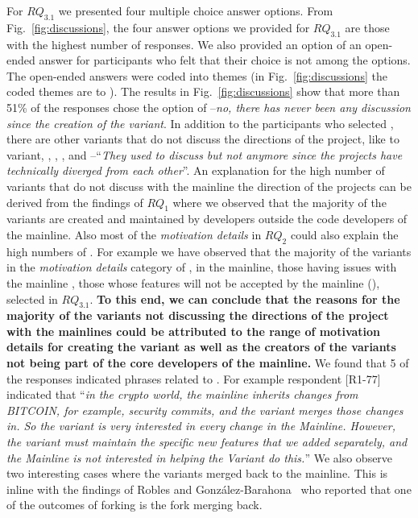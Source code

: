 \nd For $RQ_{3.1}$ we presented four multiple choice answer options. From Fig.~\ref{fig:discussions}, the four answer options we provided for $RQ_{3.1}$ are those with the highest number of responses. We also provided an option of an open-ended answer for participants who felt that their choice is not among the options. The open-ended answers were coded into themes (in Fig.~\ref{fig:discussions} the coded themes are \ra to ). 
The results in Fig.~\ref{fig:discussions} show that more than 51\% of the responses chose the option of --\textit{no, there has never been any discussion since the creation of the variant}. In addition to the participants who selected , there are other variants that do not discuss the directions of the project, like  to variant,  ,  , , and --``\emph{They used to discuss but not anymore since the projects have technically diverged from each other}''. 
An explanation for the high number of variants that do not discuss with the mainline the direction of the projects can be derived from the findings of $RQ_{1}$ where we observed that the majority of the variants are created and maintained by developers outside the code developers of the mainline. Also most of the \emph{motivation details} in $RQ_{2}$ could also explain the high numbers of . For example we have observed that the majority of the variants in the \emph{motivation details} category of ,  in the mainline, those having issues with the mainline , those whose features will not be accepted by the mainline (), selected   in $RQ_{3.1}$. \textbf{To this end, we can conclude that the reasons for the majority of the variants not discussing the directions of the project with the mainlines could be attributed to the range of motivation details for creating the variant as well as the creators of the variants not being part of the core developers of the mainline.}
We found that 5 of the responses indicated phrases related to . For example respondent [R1-77] indicated that ``\emph{in the crypto world, the mainline inherits changes from BITCOIN, for example, security commits, and the variant merges those changes in. So the variant is very interested in every change in the Mainline. However, the variant must maintain the specific new features that we added separately, and the Mainline is not interested in helping the Variant do this.}''
We also observe two interesting cases where the variants merged back to the mainline. This is inline with the findings of Robles and Gonz{\'a}lez-Barahona~\cite{Gregorio:2012} who reported that one of the outcomes of forking is the fork merging back. 

